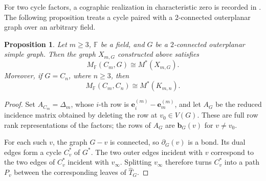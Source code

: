 \documentclass[12pt,a4paper]{article}
\numberwithin{equation}{section}
\newcommand{\F}{\mathbb F}
\newtheorem{proposition}[proposition]{Proposition}
\theoremstyle{definition}
\theoremstyle{remark}
\begin{document}
For two cycle factors, a cographic realization in characteristic zero
is recorded in \cite[Section~5.2]{hidaka-itoh}.  The following
proposition treats a cycle paired with a \(2\)-connected outerplanar
graph over an arbitrary field.
\begin{proposition}
\label{prop:outerplanar-cographic}
Let \(m\ge3\), \(\F\) be a field, and \(G\) be a \(2\)-connected outerplanar simple graph.  Then the graph \(X_{m,G}\) constructed above satisfies
\[
M_{\F}(C_m,G)\cong M^*(X_{m,G}).
\]
Moreover, if \(G=C_n\), where \(n\ge3\), then
\begin{equation}\label{eq:two-cycle-identity}
 M_{\F}(C_m,C_n)\cong M^*(K_{m,n}).
\end{equation}
\end{proposition}
\begin{proof}
Set \(A_{C_m}=\Delta_m\), whose \(i\)-th row is
\(\boldsymbol e_i^{(m)}-\boldsymbol e_m^{(m)}\), and let \(A_G\)
be the reduced incidence matrix obtained by deleting the row at
\(v_0\in V(G)\).  These are full row rank representations of the
factors; the rows of \(A_G\) are
\(\boldsymbol b_G(v)\) for \(v\ne v_0\).

For each such \(v\), the graph \(G-v\) is connected, so
\(\partial_G(v)\) is a bond.  Its dual edges form a cycle
\(C_v^*\) of \(G^*\).  The two outer edges incident with \(v\)
correspond to the two edges of \(C_v^*\) incident with
\(v_\infty\).  Splitting \(v_\infty\) therefore turns \(C_v^*\)
into a path \(P_v\) between the corresponding leaves of
\(\widehat T_G\).


\end{proof}
\end{document}
